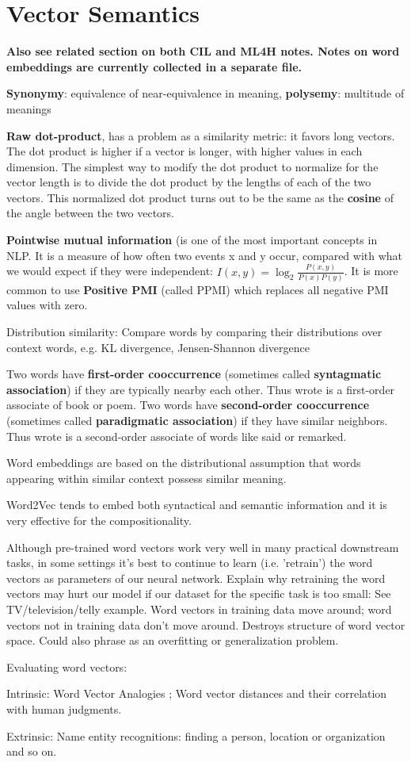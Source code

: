 \documentclass[12pt]{article}
\begin{document}
\section{Vector Semantics}
\textbf{Also see related section on both CIL and ML4H notes.  Notes on word embeddings are currently collected in a separate file.}
\par \textbf{Synonymy}: equivalence of near-equivalence in meaning, \textbf{polysemy}: multitude of meanings
\par \textbf{Raw dot-product}, has a problem as a similarity metric: it favors long vectors. The dot product is higher if a vector is longer, with higher values in each dimension. The simplest way to modify the dot product to normalize for the vector length is to divide the dot product by the lengths of each of the two vectors. This normalized dot product turns out to be the same as the \textbf{cosine} of the angle between the two vectors.
\par \textbf{Pointwise mutual information} (is one of the most important concepts in NLP. It is a measure of how often two events x and y occur, compared with what we would expect if they were independent:
$I(x,y) = \log_2 \frac{P(x,y)}{P(x)P(y)}$. It is more common to use \textbf{Positive PMI} (called PPMI) which replaces all negative PMI values with zero.
\par Distribution similarity: Compare words by comparing their distributions over context words, e.g. KL divergence, Jensen-Shannon divergence
\par Two words have \textbf{first-order cooccurrence} (sometimes called \textbf{syntagmatic association}) if they are typically nearby each other. Thus wrote is a first-order associate of book or poem. Two words have \textbf{second-order cooccurrence} (sometimes called \textbf{paradigmatic association}) if they have similar neighbors. Thus wrote is a second-order associate of words like said or remarked.
\par Word embeddings are based on the distributional assumption that words appearing within similar context possess similar meaning.
\par Word2Vec tends to embed both syntactical and semantic information and it is very effective for the compositionality.
\par Although pre-trained word vectors work very well in many practical downstream tasks, in some settings it's best to continue to learn (i.e. 'retrain') the word vectors as parameters of our neural network. Explain why retraining the word vectors may hurt our model if our dataset for the specific task is too small: See TV/television/telly example. Word vectors in training data move around; word vectors not in training data don't move around. Destroys structure of word vector space. Could also phrase as an overfitting or generalization problem.
\par Evaluating word vectors:
\ulb
\item Intrinsic: Word Vector Analogies ; Word vector distances and their correlation with human judgments.
\item Extrinsic: Name entity recognitions: finding a person, location or organization and so on.
\ule
 
\end{document}
